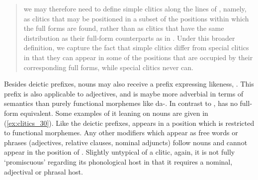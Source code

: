 \blockcquote[44]{spencerluis2012}{we may therefore need to define simple
clitics along the lines of \citet{halpern1998}, namely, as clitics that may be
positioned in a subset of the positions within which the full forms are found,
rather than as clitics that have the same distribution as their full-form
counterparts as in \citet{zwicky1977}. Under this broader definition, we
capture the fact that simple clitics differ from special clitics in that they
can appear in some of the positions that are occupied by their corresponding
full forms, while special clitics never can.}

\label{clitics_prenoun_ku}
Besides deictic prefixes, nouns may also receive a prefix expressing likeness,
. This prefix is also applicable to adjectives, and is maybe
more adverbial in terms of semantics than purely functional morphemes like
 {da-}. In contrast to ,  has no 
full-form equivalent. Some examples of it leaning on nouns are given in
(\ref{ex:clitics_30}). Like the deictic prefixes,  appears in a
position which is restricted to functional morphemes. Any other modifiers
which appear as free words or phrases (adjectives, relative clauses, nominal
adjuncts) follow nouns and cannot appear in the position of .
Slightly untypical of a clitic, again, it is not fully `promiscuous' regarding
its  phonological host in that it requires a nominal, adjectival or phrasal
host.

